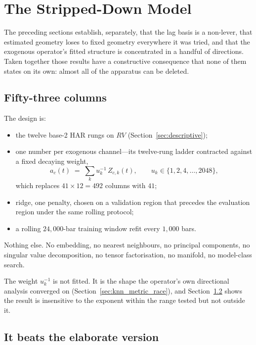 \section{The Stripped-Down Model}
\label{sec:stripped}

The preceding sections establish, separately, that the lag basis is a
non-lever, that estimated geometry loses to fixed geometry everywhere it was
tried, and that the exogenous operator's fitted structure is concentrated in a
handful of directions. Taken together those results have a constructive
consequence that none of them states on its own: almost all of the apparatus
can be deleted.

\subsection{Fifty-three columns}
\label{sec:dumb_design}

The design is:

\begin{itemize}
  \item the twelve base-2 HAR rungs on $RV$ (Section~\ref{sec:descriptive});
  \item one number per exogenous channel---its twelve-rung ladder contracted
    against a fixed decaying weight,
    \[
      a_c(t) \;=\; \sum_{k} u_k^{-1}\, Z_{c,k}(t),
      \qquad u_k \in \{1, 2, 4, \dots, 2048\},
    \]
    which replaces $41 \times 12 = 492$ columns with $41$;
  \item ridge, one penalty, chosen on a validation region that precedes the
    evaluation region under the same rolling protocol;
  \item a rolling $24{,}000$-bar training window refit every $1{,}000$ bars.
\end{itemize}

Nothing else. No embedding, no nearest neighbours, no principal components, no
singular value decomposition, no tensor factorisation, no manifold, no
model-class search.

The weight $u_k^{-1}$ is not fitted. It is the shape the operator's own
directional analysis converged on (Section~\ref{sec:knn_metric_race}), and
Section~\ref{sec:dumb_results} shows the result is insensitive to the exponent
within the range tested but not outside it.

\subsection{It beats the elaborate version}
\label{sec:dumb_results}

